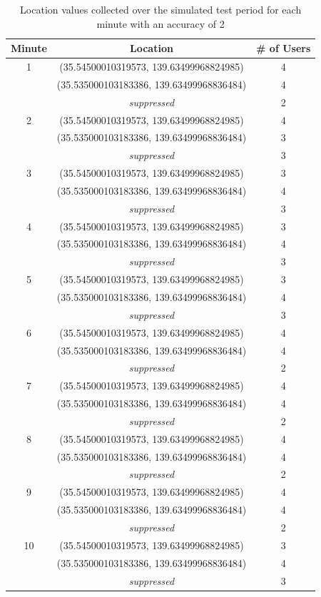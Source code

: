 \begin{table}[htbp]
	\centering
	\begin{tabular}{|c|c|c|} 
		\hline
		\textbf{Minute} & \textbf{Location} & \textbf{\# of Users}\\ [0.5ex] 
		\hline
		1 & (35.54500010319573, 139.63499968824985) & 4 \\ 
		& (35.535000103183386, 139.63499968836484) & 4 \\ 
		&\textit{suppressed} & 2 \\ 
		\hline
		2 & (35.54500010319573, 139.63499968824985) & 4 \\ 
		& (35.535000103183386, 139.63499968836484) & 3 \\ 
		&\textit{suppressed} & 3 \\ 
		\hline
		3 & (35.54500010319573, 139.63499968824985) & 3 \\ 
		& (35.535000103183386, 139.63499968836484) & 4 \\ 
		&\textit{suppressed} & 3 \\ 
		\hline
		4 & (35.54500010319573, 139.63499968824985) & 3 \\ 
		& (35.535000103183386, 139.63499968836484) & 4 \\ 
		&\textit{suppressed} & 3 \\ 
		\hline
		5 & (35.54500010319573, 139.63499968824985) & 3 \\ 
		& (35.535000103183386, 139.63499968836484) & 4 \\ 
		&\textit{suppressed} & 3 \\ 
		\hline
		6 & (35.54500010319573, 139.63499968824985) & 4 \\ 
		& (35.535000103183386, 139.63499968836484) & 4 \\ 
		&\textit{suppressed} & 2 \\ 
		\hline
		7 & (35.54500010319573, 139.63499968824985) & 4 \\ 
		& (35.535000103183386, 139.63499968836484) & 4 \\ 
		&\textit{suppressed} & 2 \\ 
		\hline
		8 & (35.54500010319573, 139.63499968824985) & 4 \\ 
		& (35.535000103183386, 139.63499968836484) & 4 \\ 
		&\textit{suppressed} & 2 \\  
		\hline
		9 & (35.54500010319573, 139.63499968824985) & 4 \\ 
		& (35.535000103183386, 139.63499968836484) & 4 \\ 
		&\textit{suppressed} & 2 \\ 
		\hline
		10 & (35.54500010319573, 139.63499968824985) & 3 \\ 
		& (35.535000103183386, 139.63499968836484) & 4 \\ 
		&\textit{suppressed} & 3 \\ 
		\hline
	\end{tabular}
	\caption{Location values collected over the simulated test period for each minute with an accuracy of 2}
	\label{tab:location_sim2}
\end{table}

